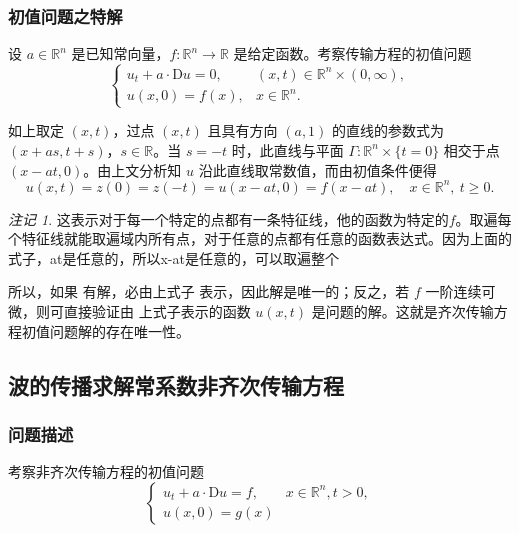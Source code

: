 \documentclass[12pt,a4paper]{article}
\numberwithin{subsection}{section}   %
\numberwithin{subsubsection}{subsection}
\theoremstyle{plain}
\theoremstyle{definition}
\theoremstyle{remark}
\newtheorem{remark}[theorem]{注记}
\theoremstyle{remark}
\begin{document}
	\subsubsection{初值问题之特解} 
	设 $a \in \mathbb{R}^n$ 是已知常向量，$f: \mathbb{R}^n \rightarrow \mathbb{R}$ 是给定函数。考察传输方程的初值问题
	\begin{equation}
		\begin{cases}
			u_t + a \cdot \mathrm{D}u = 0, & (x, t) \in \mathbb{R}^n \times (0, \infty), \\
			u(x, 0) = f(x), & x \in \mathbb{R}^n.
		\end{cases}
	\end{equation}
	
	如上取定 $(x, t)$，过点 $(x, t)$ 且具有方向 $(a, 1)$ 的直线的参数式为 $(x + a s, t + s)$，$s \in \mathbb{R}$。当 $s = -t$ 时，此直线与平面 $\Gamma: \mathbb{R}^n \times \{t = 0\}$ 相交于点 $(x - a t, 0)$。由上文分析知 $u$ 沿此直线取常数值，而由初值条件便得
	\begin{equation}\label{eq:齐次解}
	u(x,t)=	z(0)=z(-t) =u(x - a t, 0) = f(x - a t), \quad x \in \mathbb{R}^n, \ t \geq 0.
	\end{equation}
	
	\begin{remark}
	这表示对于每一个特定的点都有一条特征线，他的函数为特定的$f$。取遍每个特征线就能取遍域内所有点，对于任意的点都有任意的函数表达式。因为上面的式子，at是任意的，所以x-at是任意的，可以取遍整个
	\end{remark}
		
	所以，如果 有解，必由上式子 表示，因此解是唯一的；反之，若 $f$ 一阶连续可微，则可直接验证由 上式子表示的函数 $u(x, t)$ 是问题的解。这就是齐次传输方程初值问题解的存在唯一性。
	
\subsection{波的传播求解常系数非齐次传输方程} 
\subsubsection{问题描述}
	考察非齐次传输方程的初值问题
	\begin{equation}
		\begin{cases}
			u_t + a \cdot \mathrm{D}u = f, & x \in \mathbb{R}^n, t > 0, \\
			u(x,0) = g(x)
		\end{cases}
	\end{equation}
	
\end{document}
